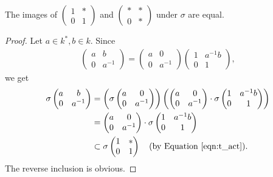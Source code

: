 \begin{proposition}\label{imb:imu}
The images of $\left(\begin{matrix}1 & *\\0 & 1\end{matrix}\right)$ and $\left(\begin{matrix}* & *\\0 & *\end{matrix}\right)$ under $\sigma$ are equal.
\end{proposition}
\begin{proof}
	Let $a\in k^*, b\in k$. Since
\begin{align*}
	\left(\begin{matrix}a & b\\0 & a^{-1}\end{matrix}\right) = 
	\left(\begin{matrix}a & 0\\0 & a^{-1}\end{matrix}\right)
	\left(\begin{matrix}1 & a^{-1}b\\0 & 1\end{matrix}\right),
\end{align*}
we get
\begin{align*}
	\sigma\left(\begin{matrix}a & b\\0 & a^{-1}\end{matrix}\right) &=
	\left(\sigma\left(\begin{matrix}a & 0\\0 & a^{-1}\end{matrix}\right)\right)
	\left(
	\left(\begin{matrix}a & 0\\0 & a^{-1}\end{matrix}\right) \cdot
	\sigma\left(\begin{matrix}1 & a^{-1}b\\0 & 1\end{matrix}\right)
	\right)\\
	&= \left(\begin{matrix}a & 0\\0 & a^{-1}\end{matrix}\right) \cdot
	\sigma\left(\begin{matrix}1 & a^{-1}b\\0 & 1\end{matrix}\right) \\
	&\subset \sigma\left(\begin{matrix}1 & *\\0 & 1\end{matrix}\right)\quad(\textrm{by Equation \ref{eqn:t_act}}).
\end{align*}
The reverse inclusion is obvious.
\end{proof}

